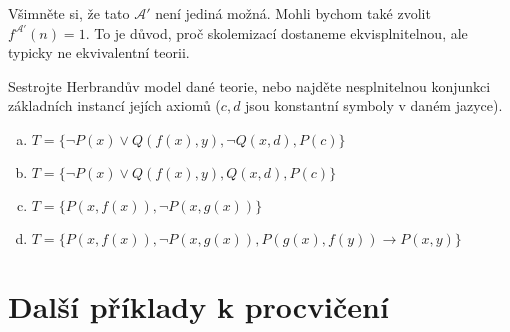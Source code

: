 \begin{problem}
\begin{solution}
\begin{enumerate}[(a)]
            Všimněte si, že tato $\mathcal A'$ není jediná možná. Mohli bychom také zvolit $f^{\mathcal A'}(n)=1$. To je důvod, proč skolemizací dostaneme ekvisplnitelnou, ale typicky ne ekvivalentní teorii.
        \end{enumerate}
    \end{solution}

\end{problem}


\begin{problem} 
    
    Sestrojte Herbrandův model dané teorie, nebo najděte nesplnitelnou konjunkci základních instancí jejích axiomů ($c,d$ jsou konstantní symboly v daném jazyce).    
    \begin{enumerate}[(a)]
        \item $T=\{\neg P(x)\vee Q(f(x),y), \neg Q(x,d), P(c)\}$
        \item $T=\{\neg P(x)\vee Q(f(x),y), Q(x,d), P(c)\}$
        \item $T=\{P(x,f(x)),\neg P(x,g(x))\}$
        \item $T=\{P(x,f(x)),\neg P(x,g(x)), P(g(x),f(y)) \to P(x,y)\}$
    \end{enumerate}

    \begin{solution}
                    
    \end{solution}

\end{problem}

        
\section*{Další příklady k procvičení}


